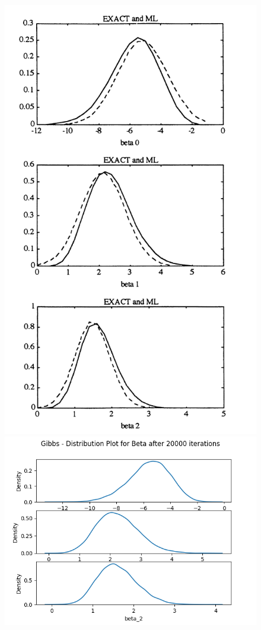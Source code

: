 \documentclass{article}
\begin{document}
\begin{figure}[htp]
    \centering
    \includegraphics[scale=0.5]{images/albert_chibb.png}
    \includegraphics[scale=0.6]{images/dist_gibbs_noinfo_20000_warmup_200.png}

\end{figure}
\end{document}
